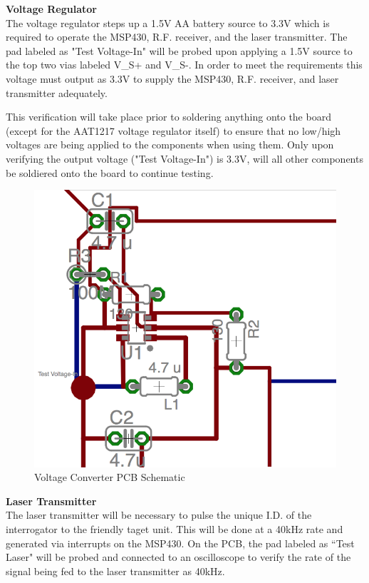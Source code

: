 \documentclass[letterpaper,10pt]{article}
\begin{document}
\begin{spacing}{1.15}
\normalsize\textbf{Voltage Regulator}\\
The voltage regulator steps up a 1.5V AA battery source to 3.3V which is required to operate the MSP430, R.F. receiver, and the laser transmitter. The pad labeled as "Test Voltage-In" will be probed upon applying a 1.5V source to the top two vias labeled V\_S+ and V\_S-. In order to meet the requirements this voltage must output as 3.3V to supply the MSP430, R.F. receiver, and laser transmitter adequately.

This verification will take place prior to soldering anything onto the board (except for the AAT1217 voltage regulator itself) to ensure that no low/high voltages are being applied to the components when using them. Only upon verifying the output voltage ("Test Voltage-In") is 3.3V, will all other components be soldiered onto the board to continue testing. 
\begin{figure} [H]
	\centering
	\includegraphics[scale=0.4]{converter-pcb.png}
	\caption{Voltage Converter PCB Schematic\label{fig:converter-pcb}}
\end{figure}

\normalsize\textbf{Laser Transmitter} \\
The laser transmitter will be necessary to pulse the unique I.D. of the interrogator to the friendly taget unit. This will be done at a 40kHz rate and generated via interrupts on the MSP430. On the PCB, the pad labeled as ``Test Laser" will be probed and connected to an oscilloscope to verify the rate of the signal being fed to the laser transmitter as 40kHz. 


\end{spacing}
\end{document}
